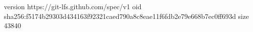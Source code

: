 version https://git-lfs.github.com/spec/v1
oid sha256:f5174b29303d434163f92321caed790a8c8eae11f6fdb2e79e668b7ec0ff693d
size 43840
